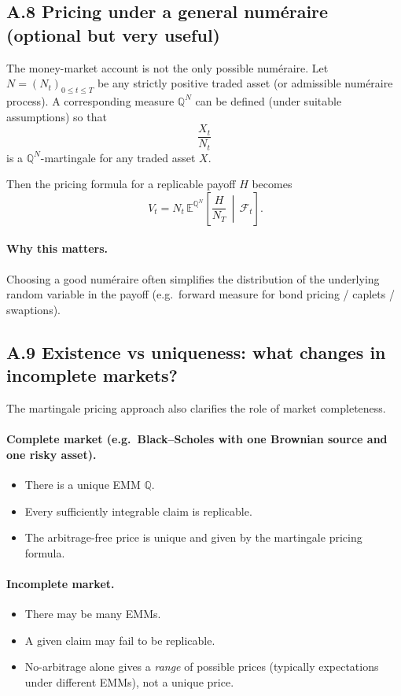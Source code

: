 \documentclass[11pt]{article}
\newcommand{\Qbb}{\mathbb{Q}}
\newcommand{\E}{\mathbb{E}}
\newcommand{\1}{\mathbf{1}}
\begin{document}
\subsection*{A.8 Pricing under a general num\'eraire (optional but very useful)}

The money-market account is not the only possible num\'eraire.
Let \(N=(N_t)_{0\le t\le T}\) be any strictly positive traded asset (or admissible num\'eraire process).
A corresponding measure \(\Qbb^N\) can be defined (under suitable assumptions) so that
$$
\frac{X_t}{N_t}
$$
is a \(\Qbb^N\)-martingale for any traded asset \(X\).

Then the pricing formula for a replicable payoff \(H\) becomes
$$
\boxed{
\ V_t = N_t\,\E^{\Qbb^N}\!\left[\frac{H}{N_T}\,\middle|\,\mathcal F_t\right].
}
$$

\paragraph{Why this matters.}
Choosing a good num\'eraire often simplifies the distribution of the underlying random variable in the payoff
(e.g.\ forward measure for bond pricing / caplets / swaptions).

\subsection*{A.9 Existence vs uniqueness: what changes in incomplete markets?}

The martingale pricing approach also clarifies the role of market completeness.

\paragraph{Complete market (e.g.\ Black--Scholes with one Brownian source and one risky asset).}
\begin{itemize}[leftmargin=1.4em]
    \item There is a unique EMM \(\Qbb\).
    \item Every sufficiently integrable claim is replicable.
    \item The arbitrage-free price is unique and given by the martingale pricing formula.
\end{itemize}

\paragraph{Incomplete market.}
\begin{itemize}[leftmargin=1.4em]
    \item There may be many EMMs.
    \item A given claim may fail to be replicable.
    \item No-arbitrage alone gives a \emph{range} of possible prices (typically expectations under different EMMs), not a unique price.
\end{itemize}
\end{document}
